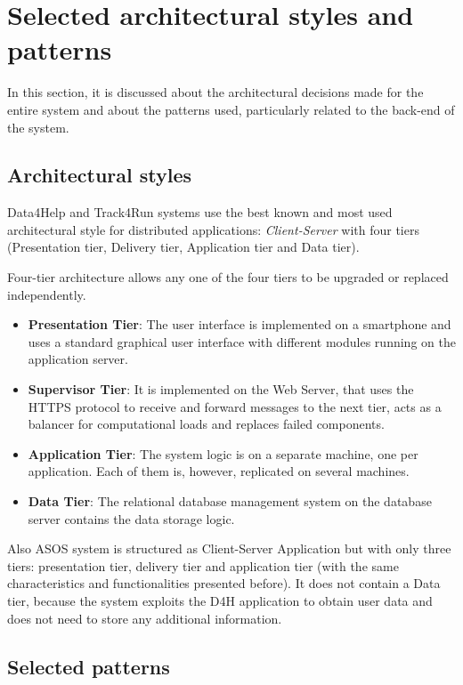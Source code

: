 \section{Selected architectural styles and patterns}
\label{ArchitecturalStylesAndPatterns}

In this section, it is discussed about the architectural decisions made for the entire system and about the patterns used, particularly related to the back-end of the system.

\subsection{Architectural styles}
Data4Help and Track4Run systems use the best known and most used architectural style for distributed applications: \emph{Client-Server} with four tiers (Presentation tier, Delivery tier, Application tier and Data tier).

Four-tier architecture allows any one of the four tiers to be upgraded or replaced independently. 
\begin{itemize}
    \item \textbf{Presentation Tier}: The user interface is implemented on a smartphone and uses a standard graphical user interface with different modules running on the application server.
    \item \textbf{Supervisor Tier}: It is implemented on the Web Server, that uses the HTTPS protocol to receive and forward messages to the next tier, acts as a balancer for computational loads and replaces failed components.
    \item \textbf{Application Tier}: The system logic is on a separate machine, one per application. Each of them is, however, replicated on several machines.
    \item \textbf{Data Tier}: The relational database management system on the database server contains the data storage logic.
\end{itemize}  

Also ASOS system is structured as Client-Server Application but with only three tiers: presentation tier, delivery tier and application tier (with the same characteristics and functionalities presented before). It does not contain a Data tier, because the system exploits the D4H application to obtain user data and does not need to store any additional information.

\subsection{Selected patterns}

